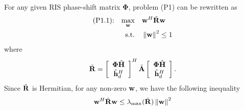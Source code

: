 \documentclass[draftclsnofoot,onecolumn,12pt]{IEEEtran}
\begin{document}
For any given RIS phase-shift matrix ${\bm \Phi}$, problem (P1) can be rewritten as
%
\begin{align}
\text{(P1.1):} \quad \underset{{\bf w}}{\max}
& \quad {\bf w}^H \tilde{\bf R}  {\bf w}\label{P7obj}\\
 \text{s.t.} & \quad \left\| {\bf w}\right\|^2 \le 1
\end{align}
where 
\begin{align}\label{R}
\tilde{\bf R}=\left[ {\begin{array}{*{20}{c}}
	{ {\bm \Phi} \hat{{\bf H}}}\\
	{\hat{{\bf h}}_d^H}
	\end{array}} \right]^H\tilde{\bf A}\left[ {\begin{array}{*{20}{c}}
	{ {\bm \Phi} \hat{{\bf H}}}\\
	{\hat{{\bf h}}_d^H}
	\end{array}} \right].
\end{align} 
Since $\tilde{\bf R}$ is Hermitian, for any non-zero ${\bf w}$, we have the following inequality
\begin{align}
{\bf w}^H \tilde{\bf R}  {\bf w} \le  \lambda_{\max}( \tilde{\bf R} )  \left\| {\bf w}\right\|^2
\end{align}
\end{document}
